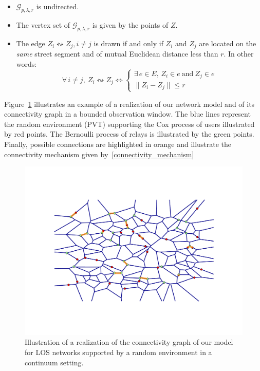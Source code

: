 \documentclass[10pt,a4paper]{amsart}
\theoremstyle{exampstyle}
\theoremstyle{exampnotations}
\begin{document}
\begin{itemize}
\item $\mathcal{G}_{p,\lambda,r}$ is undirected.
\item The vertex set of $\mathcal{G}_{p,\lambda,r}$ is given by the points of $Z$.
\item The edge $Z_{i} \leftrightsquigarrow Z_{j}, i \neq j$ is drawn if and only if $Z_{i}$ and $Z_{j}$ are located on the \emph{same} street segment and of mutual Euclidean distance less than $r$. In other words:
\begin{equation}
\label{connectivity_mechanism}
\forall \, i \neq j, \: Z_{i} \leftrightsquigarrow Z_{j} \Leftrightarrow 
\left\{
\begin{array}{l}
\exists \, e \in E, \, Z_{i} \in e  \  \text{and} \  Z_{j} \in e \\
\lVert Z_{i} - Z_{j} \rVert \leq r
\end{array}
\right.
\end{equation}
\end{itemize}
\indent Figure~\ref{fig:Network} illustrates an example of a realization of our network model and of its connectivity graph in a bounded observation window. The blue lines represent the random environment (PVT) supporting the Cox process of users illustrated by red points. The Bernoulli process of relays is illustrated by the green points. Finally, possible connections are highlighted in orange and illustrate the connectivity mechanism given by~\eqref{connectivity_mechanism}
\begin{figure}[h!]
\centering
    \includegraphics[width=0.75\linewidth]{Network.pdf}
    \caption{Illustration of a realization of the connectivity graph of our model for LOS networks supported by a random environment in a continuum setting.}
    \label{fig:Network}
\end{figure}
\end{document}
